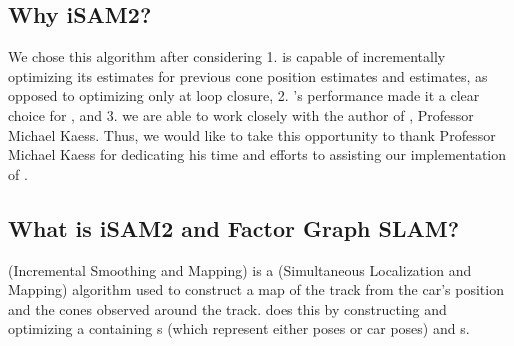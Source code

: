 \documentclass[letterpaper,10pt,english]{sphinxmanual}
\begin{document}
\subsection{Why iSAM2?}
\label{\detokenize{explainers:why-isam2}}
\sphinxAtStartPar
We chose this algorithm after considering 1. {\hyperref[\detokenize{glossary:term-iSAM2}]{}} is capable of incrementally optimizing its estimates for previous cone position estimates and {\hyperref[\detokenize{glossary:term-Pose}]{}} estimates, as opposed to optimizing only at loop closure, 2. {\hyperref[\detokenize{glossary:term-iSAM2}]{}}’s performance made it a clear choice for {\hyperref[\detokenize{glossary:term-SLAM}]{}}, and 3. we are able to work closely with the author of {\hyperref[\detokenize{glossary:term-iSAM2}]{}}, Professor Michael Kaess. Thus, we would like to take this opportunity to thank Professor Michael Kaess for dedicating his time and efforts to assisting our implementation of {\hyperref[\detokenize{glossary:term-SLAM}]{}}.


\subsection{What is iSAM2 and Factor Graph SLAM?}
\label{\detokenize{explainers:what-is-isam2-and-factor-graph-slam}}
\sphinxAtStartPar
{\hyperref[\detokenize{glossary:term-iSAM2}]{}} (Incremental Smoothing and Mapping) is a {\hyperref[\detokenize{glossary:term-SLAM}]{}} (Simultaneous Localization and Mapping) algorithm used to construct a map of the track from the car’s position and the cones observed around the track. {\hyperref[\detokenize{glossary:term-iSAM2}]{}} does this by constructing and optimizing a {\hyperref[\detokenize{glossary:term-Factor-Graph}]{}} containing {\hyperref[\detokenize{glossary:term-Variable-Node}]{}} s (which represent either {\hyperref[\detokenize{glossary:term-Landmark}]{}} poses or car poses) and {\hyperref[\detokenize{glossary:term-Factor-Node}]{}} s.
\end{document}
